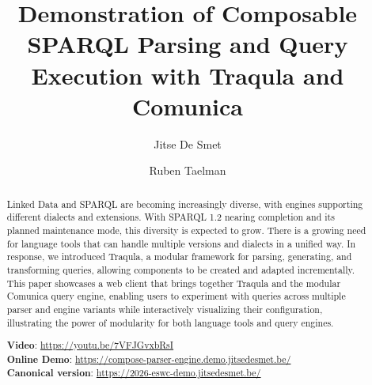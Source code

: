 \documentclass[runningheads]{llncs}
\begin{document}
%

    \title{Demonstration of Composable SPARQL Parsing and Query Execution with Traqula and Comunica}
%
%
    \author{Jitse De Smet \and
    Ruben Taelman}
%
%
%
    \maketitle              %
%
    \begin{abstract}
        Linked Data and SPARQL are becoming increasingly diverse, with engines
        supporting different dialects and extensions. With SPARQL 1.2 nearing
        completion and its planned maintenance mode, this diversity is expected
        to grow. There is a growing need for language tools that can handle
        multiple versions and dialects in a unified way. In response, we
        introduced Traqula, a modular framework for parsing, generating, and
        transforming queries, allowing components to be created and adapted
        incrementally. This paper showcases a web client that brings together
        Traqula and the modular Comunica query engine, enabling users to
        experiment with queries across multiple parser and engine variants while
        interactively visualizing their configuration, illustrating the power of
        modularity for both language tools and query engines.




        \textbf{Video}: \href{https://youtu.be/7VFJGvxbRsI}{https://youtu.be/7VFJGvxbRsI} \\
        \textbf{Online Demo}: \href{https://compose-parser-engine.demo.jitsedesmet.be/}{https://compose-parser-engine.demo.jitsedesmet.be/} \\
        \textbf{Canonical version}: \href{https://2026-eswc-demo.jitsedesmet.be/}{https://2026-eswc-demo.jitsedesmet.be/}
    \end{abstract}
%
%
%
\end{document}
